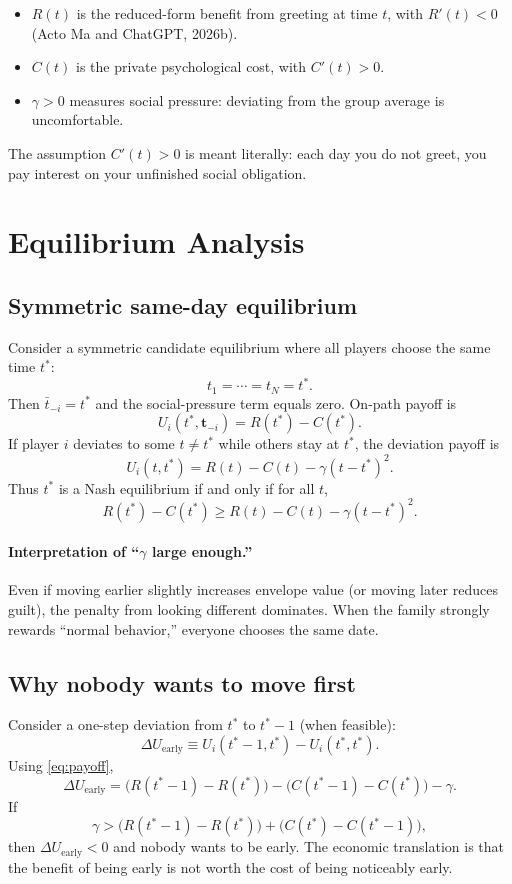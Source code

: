 \documentclass[AER]{AEA}
\begin{document}
\begin{itemize}
\item $R(t)$ is the reduced-form benefit from greeting at time $t$, with $R'(t)<0$ (Acto Ma and ChatGPT, 2026b).
\item $C(t)$ is the private psychological cost, with $C'(t)>0$.
\item $\gamma>0$ measures social pressure: deviating from the group average is uncomfortable.
\end{itemize}

The assumption $C'(t)>0$ is meant literally: each day you do not greet, you pay interest on your unfinished social obligation.

\section{Equilibrium Analysis}

\subsection{Symmetric same-day equilibrium}
Consider a symmetric candidate equilibrium where all players choose the same time $t^*$:
\[
t_1=\cdots=t_N=t^* .
\]
Then $\bar t_{-i}=t^*$ and the social-pressure term equals zero. On-path payoff is
\[
U_i(t^*,\mathbf t_{-i})=R(t^*)-C(t^*) .
\]
If player $i$ deviates to some $t\ne t^*$ while others stay at $t^*$, the deviation payoff is
\[
U_i(t,t^*)=R(t)-C(t)-\gamma (t-t^*)^2 .
\]
Thus $t^*$ is a Nash equilibrium if and only if for all $t$,
\begin{equation}
R(t^*)-C(t^*) \ge R(t)-C(t)-\gamma (t-t^*)^2 .
\label{eq:NEcondition}
\end{equation}

\paragraph{Interpretation of ``$\gamma$ large enough.''}
Even if moving earlier slightly increases envelope value (or moving later reduces guilt), the penalty from looking different dominates. When the family strongly rewards ``normal behavior,'' everyone chooses the same date.

\subsection{Why nobody wants to move first}
Consider a one-step deviation from $t^*$ to $t^*-1$ (when feasible):
\[
\Delta U_{\text{early}} \equiv U_i(t^*-1,t^*)-U_i(t^*,t^*) .
\]
Using \eqref{eq:payoff},
\begin{equation}
\Delta U_{\text{early}}
=\big(R(t^*-1)-R(t^*)\big)-\big(C(t^*-1)-C(t^*)\big)-\gamma .
\label{eq:firstmover}
\end{equation}
If
\begin{equation}
\gamma>\big(R(t^*-1)-R(t^*)\big)+\big(C(t^*)-C(t^*-1)\big),
\label{eq:gammaCondition}
\end{equation}
then $\Delta U_{\text{early}}<0$ and nobody wants to be early. The economic translation is that the benefit of being early is not worth the cost of being noticeably early.
\end{document}
